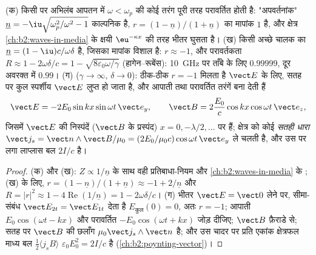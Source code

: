 \begin{proposition}[किसी प्लाज़्मा पर और किसी धातु पर परावर्तन]\label{prop:b2:wave-interfaces:conductors}
(क) किसी  पर अभिलंब आपतन में $\omega < \omega_p$ की कोई तरंग पूरी तरह
परावर्तित होती है: "अपवर्तनांक" $\underline n = -\iu\sqrt{\omega_p^2/\omega^2 - 1}$ काल्पनिक है,
$r = (1 - \underline n)/(1 + \underline n)$ का मापांक $1$ है, और क्षेत्र
\cref{ch:b2:waves-in-media} के क्षयी $\eu^{-\kappa x}$ की तरह भीतर घुसता है। (ख) किसी
अच्छे चालक का $\underline n = (1 - \iu)c/\omega\delta$ है, जिसका मापांक विशाल है: $r \approx
-1$, और परावर्तकता $R \approx 1 - 2\omega\delta/c = 1 - \sqrt{8\varepsilon_0\omega/\gamma}$
(हागेन--रूबेंस): \qty{10}{GHz} पर ताँबे के लिए $0.99999$, दूर अवरक्त में
$0.99$। (ग) \emph{} ($\gamma \to \infty$, $\delta \to 0$):
ठीक-ठीक $r = -1$ मिलता है $\vect E$ के लिए, सतह पर कुल स्पर्शीय $\vect E$ लुप्त हो जाता है,
और आपाती तथा परावर्तित तरंगें  बना देती हैं
\[
\vect E = -2E_0\sin kx\sin\omega t\,\vect e_y , \qquad
\vect B = 2\frac{E_0}c\cos kx\cos\omega t\,\vect e_z ,
\]
जिसमें $\vect E$ की निस्पंदें ($\vect B$ के प्रस्पंद) $x = 0, -\lambda/2, \dots$ पर हैं; क्षेत्र
को कोई \emph{सतही धारा} $\vect j_s = \vect n\wedge\vect B/
\mu_0 = (2E_0/\mu_0c)\cos\omega t\,\vect e_y$ ले चलती है, और उस पर लगा लाप्लास बल
 $2I/c$ है।
\end{proposition}

\begin{proof}
(क) और (ख): $Z \propto 1/\underline n$ के साथ वही प्रतिबाधा-नियम और
\cref{ch:b2:waves-in-media} के ; (ख) के लिए, $r = (1 - \underline n)/(1 +
\underline n) \approx -1 + 2/\underline n$ और $R = |r|^2 \approx 1 - 4\operatorname{Re}(1/
\underline n) = 1 - 2\omega\delta/c$। (ग) भीतर $\vect E = \vect 0$ लेने पर,
सीमा-संबंध $\vect E_{2t} = \vect E_{1t}$ देता है $E_{\text{कुल}}(0) = 0$, अतः $r =
-1$; आपाती $E_0\cos(\omega t - kx)$ और परावर्तित $-E_0\cos(\omega t + kx)$ जोड़ दीजिए;
$\vect B$ फ़ैराडे से; सतह पर $\vect B$ की छलाँग $\mu_0\vect j_s
\wedge\vect n$ है; और उस चादर पर प्रति एकांक क्षेत्रफल माध्य बल $\tfrac12\langle j_sB\rangle$
$\varepsilon_0E_0^2 = 2I/c$ है (\cref{ch:b2:poynting-vector})।
\end{proof}

